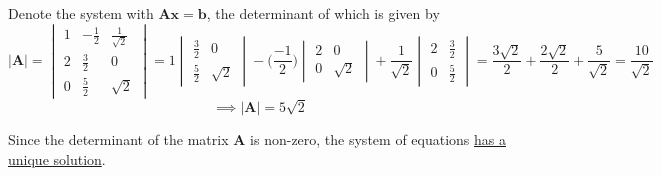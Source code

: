 Denote the system with \( \mathbf{A}\mathbf{x} = \mathbf{b} \), the determinant of which is given by
\[
    \left| \mathbf{A} \right| = \begin{vmatrix} 1 & -\frac{1}{2} & \frac{1}{\sqrt{2}} \\ 2 & \frac{3}{2} & 0 \\ 0 & \frac{5}{2} & \sqrt{2} \end{vmatrix}
    = 1 \begin{vmatrix} \frac{3}{2} & 0 \\ \frac{5}{2} & \sqrt{2} \end{vmatrix} - \Big(\frac{-1}{2}\Big) \begin{vmatrix} 2 & 0 \\ 0 & \sqrt{2} \end{vmatrix} + \frac{1}{\sqrt{2}} \begin{vmatrix} 2 & \frac{3}{2} \\ 0 & \frac{5}{2} \end{vmatrix}
    =\frac{3\sqrt{2}}{2} + \frac{2\sqrt{2}}{2} + \frac{5}{\sqrt{2}}
    = \frac{10}{\sqrt{2}}
\]
\[
    \implies \left| \mathbf{A} \right| = 5 \sqrt{2}
\]

Since the determinant of the matrix \( \mathbf{A} \) is non-zero, the system of equations \underline{has a unique solution}.
